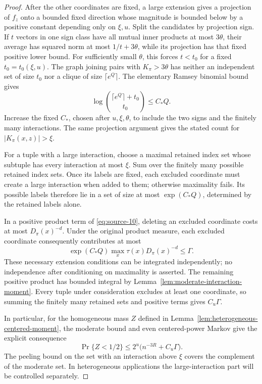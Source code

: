 \begin{proof}
After the other coordinates are fixed, a large extension gives a projection of \(f_z\) onto a bounded fixed direction whose magnitude is bounded below by a positive constant depending only on \(\xi,u\). Split the candidates by projection sign. If \(t\) vectors in one sign class have all mutual inner products at most \(3\theta\), their average has squared norm at most \(1/t+3\theta\), while its projection has that fixed positive lower bound. For sufficiently small \(\theta\), this forces \(t<t_0\) for a fixed \(t_0=t_0(\xi,u)\). The graph joining pairs with \(K_\pi>3\theta\) has neither an independent set of size \(t_0\) nor a clique of size \(\lceil e^Q\rceil\). The elementary Ramsey binomial bound gives
\[
 \log\binom{\lceil e^Q\rceil+t_0}{t_0}\le C_*Q.
\]
Increase the fixed \(C_*\), chosen after \(u,\xi,\theta\), to include the two signs and the finitely many interactions. The same projection argument gives the stated count for \(|K_\pi(x,z)|>\xi\).

For a tuple with a large interaction, choose a maximal retained index set whose subtuple has every interaction at most \(\xi\). Sum over the finitely many possible retained index sets. Once its labels are fixed, each excluded coordinate must create a large interaction when added to them; otherwise maximality fails. Its possible labels therefore lie in a set of size at most \(\exp(C_*Q)\), determined by the retained labels alone.

In a positive product term of \eqref{eq:source-10}, deleting an excluded coordinate costs at most \(D_\pi(x)^{-d}\). Under the original product measure, each excluded coordinate consequently contributes at most
\[
 \exp(C_*Q)\max_x\tau(x)D_\pi(x)^{-d}\le\Gamma.
\]
These necessary extension conditions can be integrated independently; no independence after conditioning on maximality is asserted. The remaining positive product has bounded integral by Lemma~\ref{lem:moderate-interaction-moment}. Every tuple under consideration excludes at least one coordinate, so summing the finitely many retained sets and positive terms gives \(C_u\Gamma\).

In particular, for the homogeneous mass \(Z\) defined in Lemma~\ref{lem:heterogeneous-centered-moment}, the moderate bound and even centered-power Markov give the explicit consequence
\[
 \Pr\{Z<1/2\}\le2^u\bigl(n^{-3R}+C_u\Gamma\bigr).
\]
The peeling bound on the set with an interaction above \(\xi\) covers the complement of the moderate set. In heterogeneous applications the large-interaction part will be controlled separately.
\end{proof}

